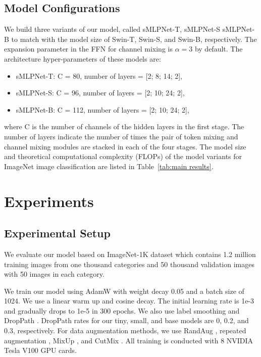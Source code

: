 \documentclass[letterpaper]{article} \usepackage{aaai22}  \usepackage{times}  \usepackage{helvet}  \usepackage{courier}  \usepackage[hyphens]{url}  \usepackage{graphicx} \usepackage{color}
\begin{document}
\subsection{Model Configurations}
We build three variants of our model, called sMLPNet-T, sMLPNet-S sMLPNet-B to match with the model size of Swin-T, Swin-S, and Swin-B, respectively. The expansion parameter in the FFN for channel mixing is $\alpha = 3$ by default. The architecture hyper-parameters of these models are: \begin{itemize}
    \item sMLPNet-T: C = 80, number of layers = [2; 8; 14; 2],
    \item sMLPNet-S: C = 96, number of layers = [2; 10; 24; 2],
    \item sMLPNet-B: C = 112, number of layers = [2; 10; 24; 2],
\end{itemize} 
where C is the number of channels of the hidden layers in the first stage. The number of layers indicate the number of times the pair of token mixing and channel mixing modules are stacked in each of the four stages. The model size and theoretical computational complexity (FLOPs) of the model variants for ImageNet image classification are listed in Table~\ref{tab:main results}.

\section{Experiments}
\subsection{Experimental Setup}
We evaluate our model based on ImageNet-1K dataset \cite{krizhevsky2012imagenet} which contains 1.2
million training images from one thousand categories and
50 thousand validation images with 50 images in each category. 

We train our model using AdamW \cite{loshchilov2018decoupled} with weight decay 0.05 and a batch size of 1024. We use a linear warm up and cosine decay. The initial learning rate is 1e-3 and gradually drops to 1e-5 in 300 epochs. We also use label smoothing \cite{szegedy2016rethinking} and DropPath \cite{larsson2016fractalnet}. DropPath rates for our tiny, small, and base models are 0, 0.2, and 0.3, respectively. For data augmentation methods, we use RandAug \cite{cubuk2020randaugment}, repeated augmentation \cite{hoffer2020augment}, MixUp \cite{zhang2018mixup}, and CutMix \cite{zhong2020random}. All training is conducted with 8 NVIDIA Tesla V100 GPU cards.
\end{document}
